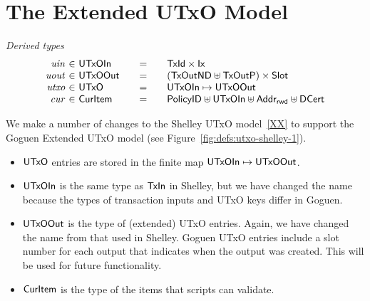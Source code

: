 \section{The Extended UTxO Model}
\label{sec:utxo}


\begin{figure*}[htb]
  \emph{Derived types}
  \begin{equation*}
    \begin{array}{r@{~\in~}l@{\qquad=\qquad}lr}
      \var{uin}
      & \UTxOIn
      & \TxId \times \Ix
      \\
      \var{uout}
      & \UTxOOut
      & (\TxOutND \uniondistinct \TxOutP) \times \Slot
      \\
      \var{utxo}
      & \UTxO
      & \UTxOIn \mapsto \UTxOOut
      \\
      \var{cur}
      & \CurItem
      & \PolicyID \uniondistinct \UTxOIn \uniondistinct \AddrRWD \uniondistinct \DCert
    \end{array}
  \end{equation*}
  \caption{Definitions used in the UTxO transition system}
  \label{fig:defs:utxo-shelley-1}
\end{figure*}


We make a number of changes to the Shelley UTxO model~\ref{XX} to support the Goguen Extended UTxO model
(see Figure~\ref{fig:defs:utxo-shelley-1}).

\begin{itemize}
\item
  $\mathsf{UTxO}$ entries are stored in the finite map $\mathsf{UTxOIn}\mapsto \mathsf{UTxOOut}$.

\item
  $\mathsf{UTxOIn}$ is the same type as $\mathsf{TxIn}$ in Shelley, but we have changed
  the name because the types of transaction inputs and UTxO keys
  differ in Goguen.

\item
  $\mathsf{UTxOOut}$ is the type of (extended) UTxO entries.  Again, we have changed the name
  from that used in Shelley.
  Goguen UTxO entries include a slot number for each output
  that indicates when the output was created.
  This will be used for future functionality. %

\item
  $\mathsf{CurItem}$ is the type of the items that scripts can validate.

\end{itemize}

